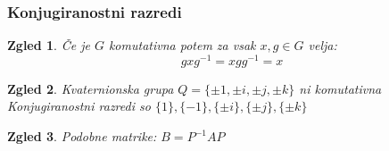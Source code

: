 \documentclass{beamer}
\newtheorem{zgled}{Zgled}
\begin{document}
\begin{frame}
\frametitle{Konjugiranostni razredi}

\begin{zgled}
    Če je $G$ komutativna potem za vsak $x,g \in G$ velja:
    \newline
    \[gxg^{-1} = xgg^{-1} = x\]
    \pause
\end{zgled}

\begin{zgled}
    Kvaternionska grupa $Q = \{\pm 1, \pm i, \pm j, \pm k\}$ ni komutativna
    \newline
    \pause
    Konjugiranostni razredi so $\{1\}, \{-1\}, \{\pm i\}, \{\pm j\}, \{\pm k\}$
    \pause
\end{zgled}

\begin{zgled}
    Podobne matrike: $B = P^{-1}AP$
\end{zgled}


\end{frame}
\end{document}
